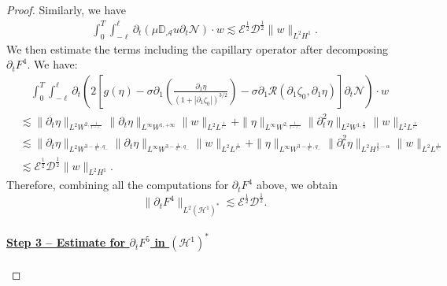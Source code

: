 \documentclass[10pt,a4paper]{amsart}
\def\p{\partial}
\begin{document}
\begin{proof}
			\noindent Similarly, we have
			\[
			\begin{aligned}
				\int_{0}^{T}\int_{-\ell}^{\ell}\p_{t}(\mu \mathbb{D}_{\mathcal{A}}u\p_{t}\mathcal{N})\cdot w
				\lesssim\mathscr{E}^{\frac{1}{2}}\mathscr{D}^{\frac{1}{2}}\|w\|_{L^{2}H^{1}}.
			\end{aligned}
			\]
			We then estimate the terms including the capillary operator after decomposing $\p_{t}F^{4}$. We have:
			\[
			\begin{aligned}
				&\quad \int_{0}^{T}\int_{-\ell}^{\ell} \p_{t}(2\left[g(\eta)-\sigma\p_1\left(\frac{\p_1\eta}{(1+|\p_1\zeta_0|)^{3/2}}\right)-\sigma\partial_{1}\mathcal{R}(\partial_{1}\zeta_{0},\partial_{1}\eta)\right]\p_t\mathcal{N})\cdot w\\
				&\lesssim \|\p_{t}\eta\|_{L^{2}W^{2,\frac{1}{1-\varepsilon_{-}}}}\|\p_{t}\eta\|_{L^{\infty}W^{1,+\infty}}\|w\|_{L^{2}L^{\frac{1}{\varepsilon_{-}}}}+\|\eta\|_{L^{\infty}W^{2,\frac{1}{1-\varepsilon_{-}}}}\|\p_{t}^{2}\eta\|_{L^{2}W^{1,\frac{1}{\alpha}}}\|w\|_{L^{2}L^{\frac{1}{\varepsilon_{-}}}}\\
				&\lesssim \|\p_{t}\eta\|_{L^{2}W^{3-\frac{1}{q_{-}},q_{-}}}\|\p_{t}\eta\|_{L^{\infty}W^{3-\frac{1}{q_{-}},q_{-}}}\|w\|_{L^{2}L^{\frac{1}{\varepsilon_{-}}}}+\|\eta\|_{L^{\infty}W^{3-\frac{1}{q_{-}},q_{-}}}\|\p_{t}^{2}\eta\|_{L^{2}H^{\frac{3}{2}-\alpha}}\|w\|_{L^{2}L^{\frac{1}{\varepsilon_{-}}}}\\
				&\lesssim \mathscr{E}^{\frac{1}{2}}\mathscr{D}^{\frac{1}{2}}\|w\|_{L^{2}H^{1}}.
			\end{aligned}
			\]
			\noindent Therefore, combining all the computations for $\p_{t}F^{4}$ above, we obtain
			\[
			\|\partial_{t}F^{4}\|_{L^{2}(\mathcal{H}^1)^{*}}\lesssim \mathscr{E}^{\frac{1}{2}}\mathscr{D}^{\frac{1}{2}}.
			\]
			
			\paragraph{\underline{Step 3 -- Estimate for $\partial_{t}F^{5}$ in $(\mathcal{H}^1)^{*}$}} 
			

\end{proof}
\end{document}
